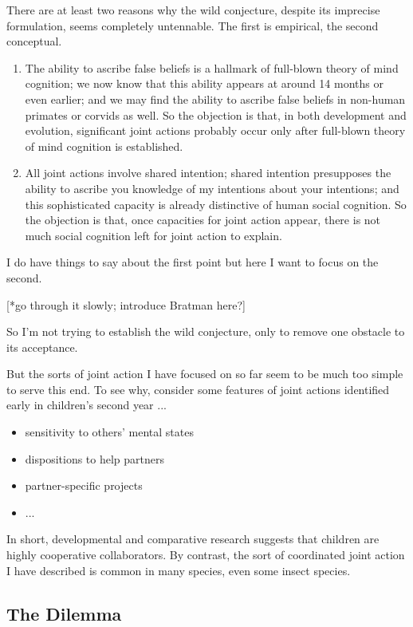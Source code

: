 \documentclass[12pt,a4paper]{extarticle}
\begin{document}
There are at least two reasons why the wild conjecture, despite its imprecise formulation, seems completely untennable.  The first is empirical, the second conceptual.
%
\begin{enumerate}
\item The ability to ascribe false beliefs is a hallmark of full-blown theory of mind cognition; we now know that this ability appears at around 14 months or even earlier; and we may  find the ability to ascribe false beliefs in non-human primates or corvids as well.  So the objection is that, in both development and evolution, significant joint actions probably occur only after full-blown theory of mind cognition is established.

\item All joint actions involve shared intention; shared intention presupposes the ability to ascribe you knowledge of my intentions about your intentions; and this sophisticated capacity is already distinctive of human social cognition.  So the objection is that, once capacities for joint action appear, there is not much social cognition left for joint action to explain.
\end{enumerate}
%
I do have things to say about the first point but here I want to focus on the second.

[*go through it slowly; introduce Bratman here?]

So I'm not trying to establish the wild conjecture, only to remove one obstacle to its acceptance.

But the sorts of joint action I have focused on so far seem to be much too simple to serve this end.  To see why, consider some features of joint actions identified early in children's second year ...

\begin{itemize}
\item sensitivity to others' mental states \citep{Buttelmann:2009gy}
\item dispositions to help partners \citep{Warneken:2006qe}
\item partner-specific projects \citep{Liebal:2010lr}
\item ...
\end{itemize}
%
In short, developmental and comparative research suggests that children are highly cooperative collaborators.  By contrast, the sort of coordinated joint action I have described is common in many species, even some insect species.


\subsection{The Dilemma}
\end{document}
